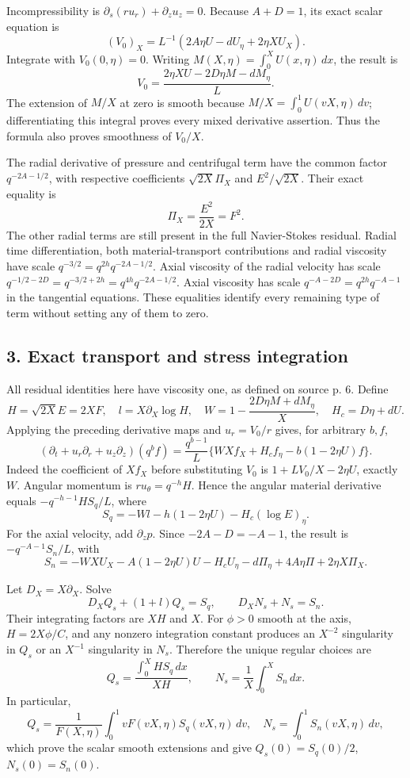 \documentclass[10pt,a4paper]{article}
\begin{document}
Incompressibility is
\(\partial_s(ru_r)+\partial_zu_z=0\). Because \(A+D=1\), its exact scalar equation is
\[
(V_0)_X=L^{-1}(2A\eta U-dU_\eta+2\eta XU_X).
\]
Integrate with \(V_0(0,\eta)=0\). Writing \(M(X,\eta)=\int_0^XU(x,\eta)\,dx\), the result is
\[
V_0=\frac{2\eta XU-2D\eta M-dM_\eta}{L}.
\]
The extension of \(M/X\) at zero is smooth because
\(M/X=\int_0^1U(vX,\eta)\,dv\); differentiating this integral proves every mixed derivative assertion. Thus the formula also proves smoothness of \(V_0/X\).

The radial derivative of pressure and centrifugal term have the common factor \(q^{-2A-1/2}\), with respective coefficients \(\sqrt{2X}\Pi_X\) and \(E^2/\sqrt{2X}\). Their exact equality is
\[
\Pi_X=\frac{E^2}{2X}=F^2.
\]
The other radial terms are still present in the full Navier-Stokes residual. Radial time differentiation, both material-transport contributions and radial viscosity have scale \(q^{-3/2}=q^{2h}q^{-2A-1/2}\). Axial viscosity of the radial velocity has scale \(q^{-1/2-2D}=q^{-3/2+2h}=q^{4h}q^{-2A-1/2}\). Axial viscosity has scale \(q^{-A-2D}=q^{2h}q^{-A-1}\) in the tangential equations. These equalities identify every remaining type of term without setting any of them to zero.

\subsection{3. Exact transport and stress integration}

All residual identities here have viscosity one, as defined on source p. 6. Define
\[
H=\sqrt{2X}E=2XF,\quad l=X\partial_X\log H,
\quad W=1-\frac{2D\eta M+dM_\eta}{X},\quad H_c=D\eta+dU.
\]
Applying the preceding derivative maps and \(u_r=V_0/r\) gives, for arbitrary \(b,f\),
\[
(\partial_t+u_r\partial_r+u_z\partial_z)(q^bf)
=\frac{q^{b-1}}L\{W Xf_X+H_cf_\eta-b(1-2\eta U)f\}.
\]
Indeed the coefficient of \(Xf_X\) before substituting \(V_0\) is \(1+LV_0/X-2\eta U\), exactly \(W\). Angular momentum is \(ru_\theta=q^{-h}H\). Hence the angular material derivative equals \(-q^{-h-1}HS_q/L\), where
\[
S_q=-Wl-h(1-2\eta U)-H_c(\log E)_\eta.
\]
For the axial velocity, add \(\partial_zp\). Since \(-2A-D=-A-1\), the result is \(-q^{-A-1}S_n/L\), with
\[
S_n=-WXU_X-A(1-2\eta U)U-H_cU_\eta
-d\Pi_\eta+4A\eta\Pi+2\eta X\Pi_X.
\]

Let \(D_X=X\partial_X\). Solve
\[
D_XQ_s+(1+l)Q_s=S_q,\qquad D_XN_s+N_s=S_n.
\]
Their integrating factors are \(XH\) and \(X\). For \(\phi>0\) smooth at the axis, \(H=2X\phi/C\), and any nonzero integration constant produces an \(X^{-2}\) singularity in \(Q_s\) or an \(X^{-1}\) singularity in \(N_s\). Therefore the unique regular choices are
\[
Q_s=\frac{\int_0^XHS_q\,dx}{XH},\qquad
N_s=\frac1X\int_0^XS_n\,dx.
\]
In particular,
\[
Q_s=\frac1{F(X,\eta)}\int_0^1vF(vX,\eta)S_q(vX,\eta)\,dv,
\quad N_s=\int_0^1S_n(vX,\eta)\,dv,
\]
which prove the scalar smooth extensions and give \(Q_s(0)=S_q(0)/2\), \(N_s(0)=S_n(0)\).
\end{document}
